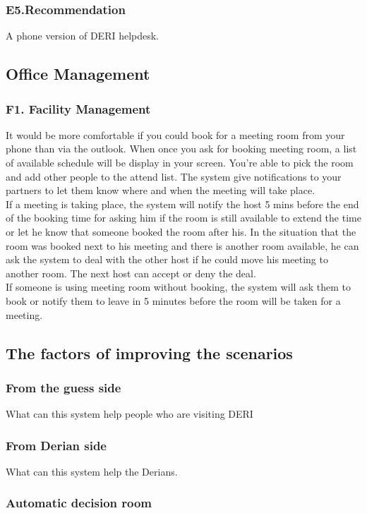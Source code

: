 \documentclass[a4paper]{llncs}
\begin{document}
\subsubsection{E5.Recommendation}
A phone version of DERI helpdesk. 
\subsection{Office Management}
\subsubsection{F1. Facility Management}
It would be more comfortable if you could book for a meeting room from your phone than via the outlook. When once you ask for booking meeting room, a list of available schedule will be display in your screen. You're able to pick the room and add other people to the attend list. The system give notifications to your partners to let them know where and when the meeting will take place.\\
If a meeting is taking place, the system will notify the host 5 mins before the end of the booking time for asking him if the room is still available to extend the time or let he know that someone booked the room after his. In the situation that the room was booked next to his meeting and there is another room available, he can ask the system to deal with the other host if he could move his meeting to another room. The next host can accept or deny the deal.\\
If someone is using meeting room without booking, the system will ask them to book or notify them to leave in 5 minutes before the room will be taken for a meeting.
\subsection{The factors of improving the scenarios}
\subsubsection{From the guess side}
What can this system help  people who are visiting DERI
 \subsubsection{From Derian side}
What can this system help the Derians.
\subsubsection{Automatic decision room}
\end{document}
